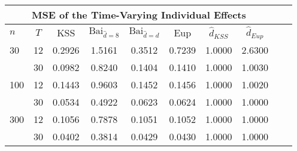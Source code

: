 \begin{tabular}{lccccccccc} 
\hline \multicolumn{8}{c}{MSE of the Time-Varying Individual Effects} \\ \hline 
$n$ & $T$ & KSS & $ \text{Bai}_{\hat{d} = 8}$ & $\text{Bai}_{\hat{d} = d}$ & Eup & $\hat{d}_{KSS}$ & $\hat{d}_{Eup}$ \\
\hline
30 & 12 &  0.2926  &  1.5161  &  0.3512  &  0.7239  &  1.0000  &  2.6300  \\
& 30 &  0.0982  &  0.8240  &  0.1404  &  0.1410  &  1.0000  &  1.0030  \\
100 & 12 &  0.1443  &  0.9603  &  0.1452  &  0.1456  &  1.0000  &  1.0020  \\
& 30 &  0.0534  &  0.4922  &  0.0623  &  0.0624  &  1.0000  &  1.0000  \\
300 & 12 &  0.1056  &  0.7878  &  0.1051  &  0.1052  &  1.0000  &  1.0000  \\
& 30 &  0.0402  &  0.3814  &  0.0429  &  0.0430  &  1.0000  &  1.0000  \\
\end{tabular} 
